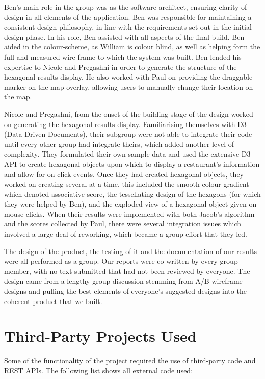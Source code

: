 \documentclass[10pt,a4paper]{article}
\begin{document}
Ben’s main role in the group was as the software architect, ensuring clarity of design in all elements of the application. Ben was responsible for maintaining a consistent design philosophy, in line with the requirements set out in the initial design phase. In his role, Ben assisted with all aspects of the final build. Ben aided in the colour-scheme, as William is colour blind, as well as helping form the full and measured wire-frame to which the system was built. Ben lended his expertise to Nicole and Pregashni in order to generate the structure of the hexagonal results display. He also worked with Paul on providing the draggable marker on the map overlay, allowing users to manually change their location on the map.

Nicole and Pregashni, from the onset of the building stage of the design worked on generating the hexagonal results display. Familiarising themselves with D3 (Data Driven Documents), their subgroup were not able to integrate their code until every other group had integrate theirs, which added another level of complexity. They formulated their own sample data and used the extensive D3 API to create hexagonal objects upon which to display a restaurant's information and allow for on-click events. Once they had created hexagonal objects, they worked on creating several at a time, this included the smooth colour gradient which denoted associative score, the tessellating design of the hexagons (for which they were helped by Ben), and the exploded view of a hexagonal object given on mouse-clicks. When their results were implemented with both Jacob’s algorithm and the scores collected by Paul, there were several integration issues which involved a large deal of reworking, which became a group effort that they led.

The design of the product, the testing of it and the documentation of our results were all performed as a group. Our reports were co-written by every group member, with no text submitted that had not been reviewed by everyone. The design came from a lengthy group discussion stemming from A/B wireframe designs and pulling the best elements of everyone’s suggested designs into the coherent product that we built.


\section*{Third-Party Projects Used}

Some of the functionality of the project required the use of third-party code and REST APIs. The following list shows all external code used:
\end{document}
